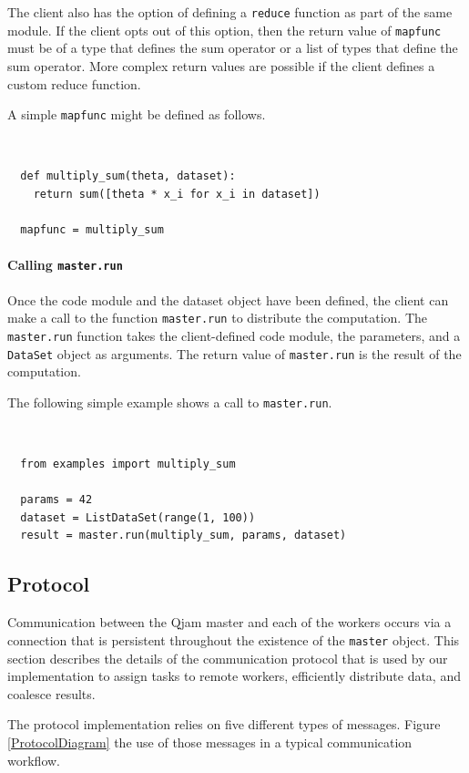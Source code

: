 \documentclass[%
  final,
  notitlepage,
  narroweqnarray,
  inline,
]{ieee}
\begin{document}
The client also has the option of defining a \texttt{reduce} function as part
of the same module. If the client opts out of this option, then the return
value of \texttt{mapfunc} must be of a type that defines the sum operator or
a list of types that define the sum operator. More complex return values are
possible if the client defines a custom reduce function.

A simple \texttt{mapfunc} might be defined as follows.

{\tt \small
\begin{verbatim}
  def multiply_sum(theta, dataset):
    return sum([theta * x_i for x_i in dataset])

  mapfunc = multiply_sum
\end{verbatim}}


\paragraph{Calling \texttt{master.run}}

Once the code module and the dataset object have been defined, the client can
make a call to the function \texttt{master.run} to distribute the
computation. The \texttt{master.run} function takes the client-defined code
module, the parameters, and a \texttt{DataSet} object as arguments. The return
value of \texttt{master.run} is the result of the computation.

The following simple example shows a call to \texttt{master.run}.

{\tt \small
\begin{verbatim}
  from examples import multiply_sum

  params = 42
  dataset = ListDataSet(range(1, 100))
  result = master.run(multiply_sum, params, dataset)
\end{verbatim}}


\subsection{Protocol}
\label{Protocol}

Communication between the Qjam master and each of the workers occurs via
a connection that is persistent throughout the existence of the \texttt{master}
object. This section describes the details of the communication protocol that
is used by our implementation to assign tasks to remote workers, efficiently
distribute data, and coalesce results.

The protocol implementation relies on five different types of messages.
Figure \ref{ProtocolDiagram} the use of those messages in a typical
communication workflow.
\end{document}
